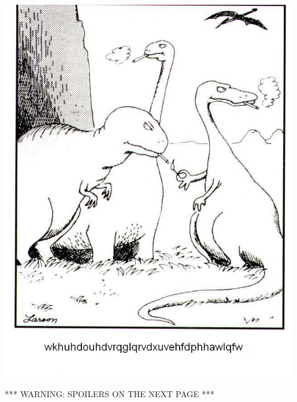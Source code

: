 \begin{center}
\includegraphics[width=5in]{dino-ciphertext.jpg}
\end{center}

\begin{center}
*** WARNING: SPOILERS ON THE NEXT PAGE *** 
\end{center}


